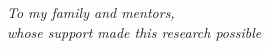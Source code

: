 \null\vfill
\begin{center}
\textsl{To my family and mentors, \\ whose support made this research possible}
\end{center}
\vfill
